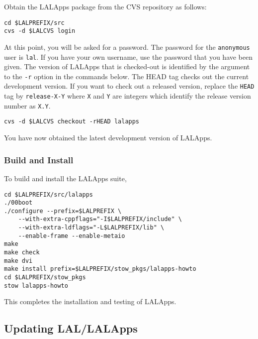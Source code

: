 Obtain the LALApps package from the CVS repository as follows:  
\begin{verbatim}
cd $LALPREFIX/src
cvs -d $LALCVS login
\end{verbatim}
At this point,  you will be asked for a password.  The password for the
\verb+anonymous+ user is \verb+lal+. If you have your own username, use the
password that you have been given.
The version of LALApps that is checked-out is identified by the argument
to the \texttt{-r} option in the commands below.   The HEAD tag checks out the
current development version.  If you want to check out a released
version, replace the \verb+HEAD+ tag by \verb+release-X-Y+ where
\verb+X+ and \verb+Y+ are integers which identify the release version
number as \verb+X.Y+.
\begin{verbatim}
cvs -d $LALCVS checkout -rHEAD lalapps
\end{verbatim}
You have now obtained the latest development version of LALApps.

\subsubsection{Build and Install}
To build and install the LALApps suite, 
\begin{verbatim}
cd $LALPREFIX/src/lalapps
./00boot
./configure --prefix=$LALPREFIX \
    --with-extra-cppflags="-I$LALPREFIX/include" \
    --with-extra-ldflags="-L$LALPREFIX/lib" \
    --enable-frame --enable-metaio
make
make check
make dvi
make install prefix=$LALPREFIX/stow_pkgs/lalapps-howto
cd $LALPREFIX/stow_pkgs
stow lalapps-howto
\end{verbatim}
This completes the installation and testing of LALApps.  

\color{black}
\subsection{Updating LAL/LALApps}
\color{black}

